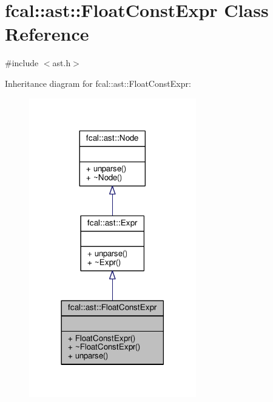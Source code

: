 \hypertarget{classfcal_1_1ast_1_1FloatConstExpr}{}\section{fcal\+:\+:ast\+:\+:Float\+Const\+Expr Class Reference}
\label{classfcal_1_1ast_1_1FloatConstExpr}


{\ttfamily \#include $<$ast.\+h$>$}



Inheritance diagram for fcal\+:\+:ast\+:\+:Float\+Const\+Expr\+:
\nopagebreak
\begin{figure}[H]
\begin{center}
\leavevmode
\includegraphics[width=206pt]{classfcal_1_1ast_1_1FloatConstExpr__inherit__graph}
\end{center}
\end{figure}


